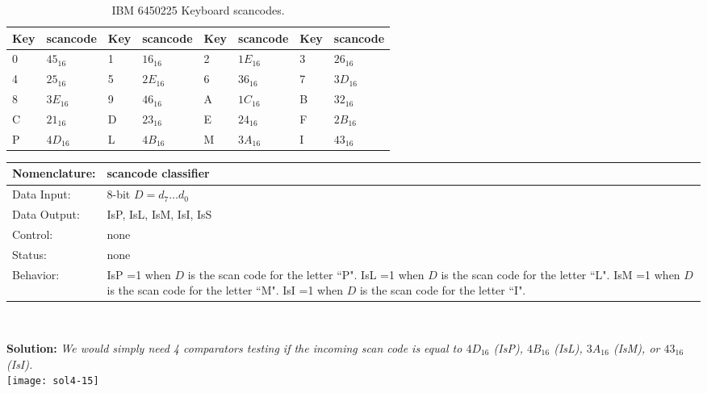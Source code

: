 \begin{enumerate}
            \begin{table}[h]
                \begin{tabular}{|l|l||l|l||l|l||l|l|} \hline
                    Key & scancode & Key & scancode & Key & scancode & Key & scancode \\ \hline \hline
                    0 & $45_{16}$ & 1 & $16_{16}$ & 2 & $1E_{16}$ & 3 & $26_{16}$ \\ \hline
                    4 & $25_{16}$ & 5 & $2E_{16}$ & 6 & $36_{16}$ & 7 & $3D_{16}$ \\ \hline
                    8 & $3E_{16}$ & 9 & $46_{16}$ & A & $1C_{16}$ & B & $32_{16}$ \\ \hline
                    C & $21_{16}$ & D & $23_{16}$ & E & $24_{16}$ & F & $2B_{16}$ \\ \hline
                    P & $4D_{16}$ & L & $4B_{16}$ & M & $3A_{16}$ & I & $43_{16}$ \\ \hline
                \end{tabular}
                \caption{IBM 6450225 Keyboard scancodes.}%
                \label{table:scancodes}
            \end{table}
            \label{page:scanclass}
            \begin{tabular}{|l|p{3.5in}|} \hline
                Nomenclature:  & scancode classifier                   \\ \hline
                Data Input:    & 8-bit $D=d_7 \ldots d_0$          \\ \hline
                Data Output:   & IsP, IsL, IsM, IsI, IsS \\ \hline
                Control:       & none             \\ \hline
                Status:        & none                                   \\ \hline
                Behavior:      & IsP =1 when $D$ is the scan code for the letter ``P".
                IsL =1 when $D$ is the scan code for the letter ``L".
                IsM =1 when $D$ is the scan code for the letter ``M".
                IsI =1 when $D$ is the scan code for the letter ``I".\\ \hline
            \end{tabular}\\
            \begin{onlysolution} \textbf{Solution:}
                \textit{\color{blue} We would simply need 4 comparators testing if the incoming scan code is equal to $4D_{16}$ (IsP), $4B_{16}$ (IsL), $3A_{16}$ (IsM), or $43_{16}$ (IsI).}\\
                \texttt{[image: sol4-15]}


\end{onlysolution}
\end{enumerate}
